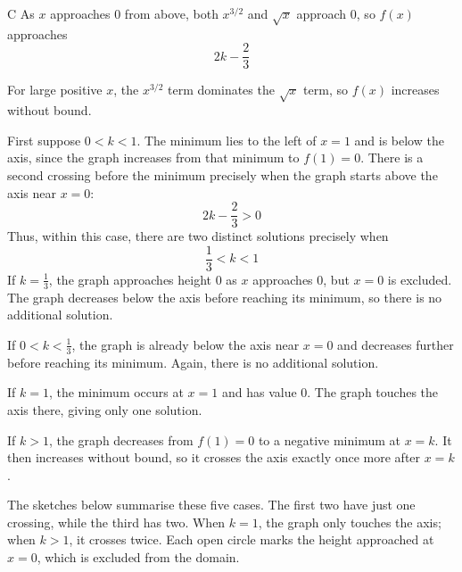 \documentclass[11pt,a4paper]{article}
\begin{document}
\begin{enumerate}[label=\textbf{\arabic*.},leftmargin=*,itemsep=0pt,start=6]
\begin{djsSolution}{C}
As $x$ approaches $0$ from above, both $x^{3/2}$ and $\sqrt x$ approach $0$, so $f(x)$ approaches
\[
2k-\frac23
\]

For large positive $x$, the $x^{3/2}$ term dominates the $\sqrt x$ term, so $f(x)$ increases without bound.

First suppose $0<k<1$. The minimum lies to the left of $x=1$ and is below the axis, since the graph increases from that minimum to $f(1)=0$. There is a second crossing before the minimum precisely when the graph starts above the axis near $x=0$:
\[
2k-\frac23>0
\]
Thus, within this case, there are two distinct solutions precisely when
\[
\frac13<k<1
\]
If $k=\frac13$, the graph approaches height $0$ as $x$ approaches $0$, but $x=0$ is excluded. The graph decreases below the axis before reaching its minimum, so there is no additional solution.

If $0<k<\frac13$, the graph is already below the axis near $x=0$ and decreases further before reaching its minimum. Again, there is no additional solution.

If $k=1$, the minimum occurs at $x=1$ and has value $0$. The graph touches the axis there, giving only one solution.

If $k>1$, the graph decreases from $f(1)=0$ to a negative minimum at $x=k$. It then increases without bound, so it crosses the axis exactly once more after $x=k$.

The sketches below summarise these five cases. The first two have just one crossing, while the third has two. When $k=1$, the graph only touches the axis; when $k>1$, it crosses twice. Each open circle marks the height approached at $x=0$, which is excluded from the domain.


\end{djsSolution}
\end{enumerate}
\end{document}
